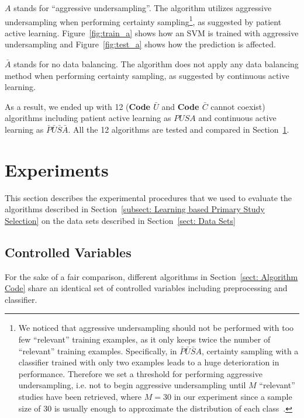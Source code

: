 \documentclass[final,twocolumn,5p]{elsarticle}
\theoremstyle{break}
\begin{document}
\begin{itemize}
\textbf{$A$} stands for ``aggressive undersampling''. The algorithm utilizes aggressive undersampling when performing certainty sampling\footnote{We noticed that aggressive undersampling should not be performed with too few ``relevant'' training examples, as it only keeps twice the number of ``relevant'' training examples. Specifically, in $\bar{P}\bar{U}\bar{S}A$, certainty sampling with a classifier trained with only two examples leads to a huge deterioration in performance. Therefore we set a threshold for performing aggressive undersampling, i.e. not to begin aggressive undersampling until $M$ ``relevant'' studies have been retrieved, where $M=30$ in our experiment since a sample size of $30$ is usually
enough to approximate the distribution of each class~\cite{isotalo2001basics}.}, as suggested by patient active learning. Figure~\ref{fig:train_a} shows how an SVM is trained with aggressive undersampling and Figure~\ref{fig:test_a} shows how the prediction is affected.

\textbf{$\bar{A}$} stands for no data balancing. The algorithm does not apply any data balancing method when performing certainty sampling, as suggested by continuous active learning.

\end{itemize}

As a result, we ended up with 12 (\textbf{Code $\bar{U}$} and \textbf{Code $\bar{C}$} cannot coexist) algorithms including patient active learning as $PUSA$ and continuous active learning as $\bar{P}\bar{U}\bar{S}\bar{A}$. All the 12 algorithms are tested and compared in Section~\ref{sect: Experiments}.

\section{Experiments}
\label{sect: Experiments}

This section describes the experimental procedures that we used to evaluate the algorithms described in Section~\ref{subsect: Learning based Primary Study Selection} on the data sets described in Section~\ref{sect: Data Sets}

\subsection{Controlled Variables}
\label{subsect: Controlled Variables}

For the sake of a fair comparison, different algorithms in Section~\ref{sect: Algorithm Code} share an identical set of controlled variables including preprocessing and classifier. 
\end{document}
